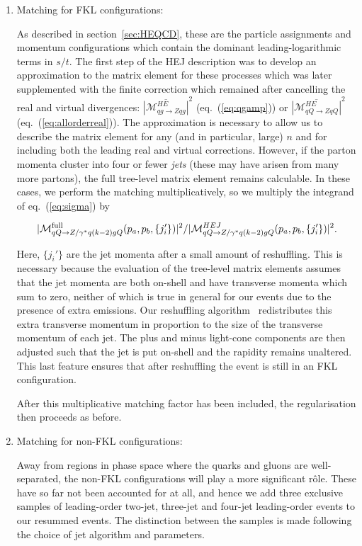 	\begin{enumerate}
		\item Matching for FKL configurations:

		  As described in section~\ref{sec:HEQCD}, these are the particle assignments
		  and momentum configurations which contain the dominant leading-logarithmic
		  terms in $s/t$.  The first step of the HEJ description was to develop an
		  approximation to the matrix element for these processes which was later
		  supplemented with the finite correction which remained after cancelling the
		  real and virtual divergences: $\overline{|\mathcal{M}_{qg\to Zqg}^{HE}|}^2$
		  (eq.~(\ref{eq:qgamp})) or $\overline{|\mathcal{M}_{qQ\to ZqQ}^{HE}|}^2$
		  (eq.~(\ref{eq:allorderreal})).  The approximation is necessary to allow us to
		  describe the matrix element for any (and in particular, large) $n$ and for
		  including both the leading real and virtual corrections.  However,
		  if the parton momenta cluster into four or fewer \emph{jets} (these
		  may have arisen from many more partons), the full tree-level matrix element remains
		  calculable.  In these cases, we perform the matching multiplicatively, so we
		  multiply the integrand of eq.~(\ref{eq:sigma}) by

		  \begin{align}
		    |\mathcal{M}^{\rm full}_{qQ\to Z/\gamma^* q(k-2)gQ}(p_a,p_b,\{
		    j_i'\})|^2/|\mathcal{M}^{HEJ}_{qQ\to Z/\gamma^* q(k-2)gQ}(p_a,p_b,\{j_i'\})|^2.
		  \end{align}

		  Here, $\{j_i'\}$ are the jet momenta after a small amount of
		  reshuffling.  This is necessary because the evaluation of the tree-level matrix elements
		  assumes that the jet momenta are both on-shell and have transverse momenta which
		  sum to zero, neither of which is true in general for our events due to the
		  presence of extra emissions.  Our reshuffling algorithm~\cite{Andersen:2011hs} redistributes this
		  extra transverse momentum in proportion to the size of the transverse
		  momentum of each jet.  The plus and minus light-cone components are then adjusted such
		  that the jet is put on-shell and the rapidity remains unaltered.  This last
		  feature ensures that after reshuffling the event is still in an FKL
		  configuration.

		  After this multiplicative matching factor has been included, the regularisation then proceeds as before.

		\item Matching for non-FKL configurations:

		  Away from regions in phase space where the quarks and gluons are
		  well-separated, the non-FKL configurations will play a more significant
		  r\^ole.  These have so far not been accounted for at all, and hence we add
		  three exclusive samples of leading-order two-jet, three-jet and four-jet
		  leading-order events to our resummed events.  The distinction between the
		  samples is made following the choice of jet algorithm and parameters.

	\end{enumerate}

